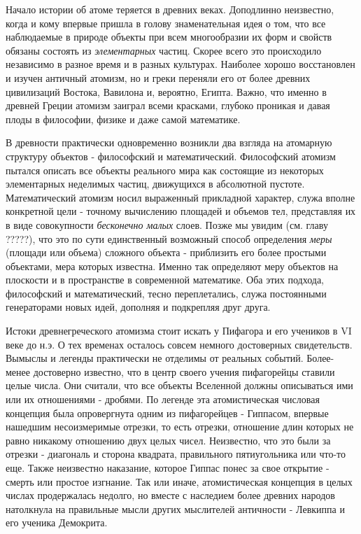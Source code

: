 Начало истории об атоме теряется в древних веках.
Доподлинно неизвестно, когда и кому впервые пришла в голову знаменательная идея о том, что все наблюдаемые в природе объекты при всем многообразии их форм и свойств обязаны состоять из \textit{элементарных} частиц.
Скорее всего это происходило независимо в разное время и в разных культурах.
Наиболее хорошо восстановлен и изучен античный атомизм, но и греки переняли его от более древних цивилизаций Востока, Вавилона и, вероятно, Египта.
Важно, что именно в древней Греции атомизм заиграл всеми красками, глубоко проникая и давая плоды в философии, физике и даже самой математике.

В древности практически одновременно возникли два взгляда на атомарную структуру объектов - философский и математический.
Философский атомизм пытался описать все объекты реального мира как состоящие из некоторых элементарных неделимых частиц, движущихся в абсолютной пустоте.
Математический атомизм носил выраженный прикладной характер, служа вполне конкретной цели - точному вычислению площадей и объемов тел, представляя их в виде совокупности \textit{бесконечно малых} слоев.
Позже мы увидим (см. главу ?????), что это по сути единственный возможный способ определения \textit{меры} (площади или объема) сложного объекта - приблизить его более простыми объектами, мера которых известна.
Именно так определяют меру объектов на плоскости и в пространстве в современной математике.
Оба этих подхода, философский и математический, тесно переплетались, служа постоянными генераторами новых идей, дополняя и подкрепляя друг друга.

Истоки древнегреческого атомизма стоит искать у Пифагора и его учеников в VI веке до н.э. 
О тех временах осталось совсем немного достоверных свидетельств.
Вымыслы и легенды практически не отделимы от реальных событий.
Более-менее достоверно известно, что в центр своего учения пифагорейцы ставили целые числа.
Они считали, что все объекты Вселенной должны описываться ими или их отношениями - дробями.
По легенде эта атомистическая числовая концепция была опровергнута одним из пифагорейцев - Гиппасом, впервые нашедшим несоизмеримые отрезки, то есть отрезки, отношение длин которых не равно никакому отношению двух целых чисел.
Неизвестно, что это были за отрезки - диагональ и сторона квадрата, правильного пятиугольника или что-то еще.
Также неизвестно наказание, которое Гиппас понес за свое открытие - смерть или простое изгнание.   
Так или иначе, атомистическая концепция в целых числах продержалась недолго, но вместе с наследием более древних народов натолкнула на правильные мысли других мыслителей античности - Левкиппа и его ученика Демокрита.

